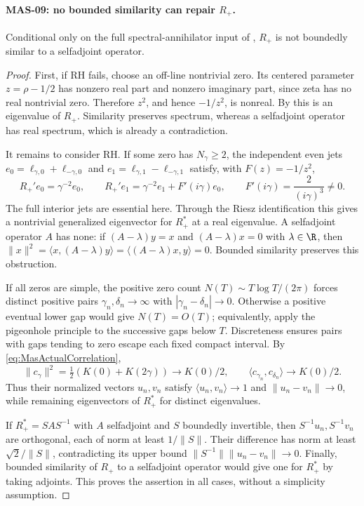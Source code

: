 \paragraph{MAS-09: no bounded similarity can repair $R_+$.}
Conditional only on the full spectral-annihilator input of , $R_+$ is not boundedly similar to a selfadjoint operator.
\begin{proof}
First, if RH fails, choose an off-line nontrivial zero. Its centered parameter $z=\rho-1/2$ has nonzero real part and nonzero imaginary part, since zeta has no real nontrivial zero. Therefore $z^2$, and hence $-1/z^2$, is nonreal. By  this is an eigenvalue of $R_+$. Similarity preserves spectrum, whereas a selfadjoint operator has real spectrum, which is already a contradiction.

It remains to consider RH. If some zero has $N_\gamma\ge2$, the independent even jets
$e_0=\ell_{\gamma,0}+\ell_{-\gamma,0}$ and
$e_1=\ell_{\gamma,1}-\ell_{-\gamma,1}$ satisfy, with $F(z)=-1/z^2$,
\[
 R_+'e_0=\gamma^{-2}e_0,\qquad
 R_+'e_1=\gamma^{-2}e_1+F'(i\gamma)e_0,\qquad
 F'(i\gamma)=\frac{2}{(i\gamma)^3}\ne0.
\]
The full interior jets are essential here. Through the Riesz identification this gives a nontrivial generalized eigenvector for $R_+^*$ at a real eigenvalue. A selfadjoint operator $A$ has none: if
$(A-\lambda)y=x$ and $(A-\lambda)x=0$ with $\lambda\in\R$, then
$\|x\|^2=\langle x,(A-\lambda)y\rangle=\langle(A-\lambda)x,y\rangle=0$.
Bounded similarity preserves this obstruction.

If all zeros are simple, the positive zero count $N(T)\sim T\log T/(2\pi)$ forces distinct positive pairs $\gamma_n,\delta_n\to\infty$ with $|\gamma_n-\delta_n|\to0$. Otherwise a positive eventual lower gap would give $N(T)=O(T)$; equivalently, apply the pigeonhole principle to the successive gaps below $T$. Discreteness ensures pairs with gaps tending to zero escape each fixed compact interval.
By \eqref{eq:MasActualCorrelation},
\[
 \|c_\gamma\|^2=\tfrac12(K(0)+K(2\gamma))\longrightarrow K(0)/2,
 \qquad
 \langle c_{\gamma_n},c_{\delta_n}\rangle\longrightarrow K(0)/2.
\]
Thus their normalized vectors $u_n,v_n$ satisfy
$\langle u_n,v_n\rangle\to1$ and $\|u_n-v_n\|\to0$, while remaining eigenvectors of $R_+^*$ for distinct eigenvalues.

If $R_+^*=SAS^{-1}$ with $A$ selfadjoint and $S$ boundedly invertible, then
$S^{-1}u_n,S^{-1}v_n$ are orthogonal, each of norm at least $1/\|S\|$. Their difference has norm at least $\sqrt2/\|S\|$, contradicting its upper bound
$\|S^{-1}\|\|u_n-v_n\|\to0$. Finally, bounded similarity of $R_+$ to a selfadjoint operator would give one for $R_+^*$ by taking adjoints. This proves the assertion in all cases, without a simplicity assumption.
\end{proof}

